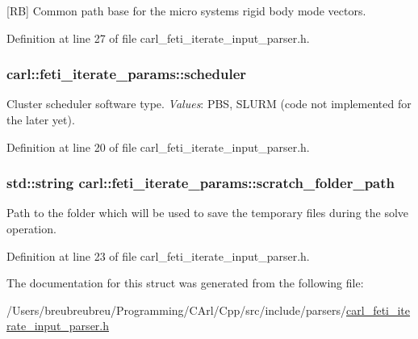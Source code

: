 \mbox{[}R\+B\mbox{]} Common path base for the micro system\textquotesingle{}s rigid body mode vectors. 



Definition at line 27 of file carl\+\_\+feti\+\_\+iterate\+\_\+input\+\_\+parser.\+h.

\hypertarget{structcarl_1_1feti__iterate__params_a5154ac3475a52b9973386fde31d82c83}{}
\subsubsection[{scheduler}]{ carl\+::feti\+\_\+iterate\+\_\+params\+::scheduler}\label{structcarl_1_1feti__iterate__params_a5154ac3475a52b9973386fde31d82c83}


Cluster scheduler software type. {\itshape Values}\+: P\+B\+S, S\+L\+U\+R\+M (code not implemented for the later yet). 



Definition at line 20 of file carl\+\_\+feti\+\_\+iterate\+\_\+input\+\_\+parser.\+h.

\hypertarget{structcarl_1_1feti__iterate__params_a6f87360ece51431590f3a03f15945e55}{}
\subsubsection[{scratch\+\_\+folder\+\_\+path}]{\setlength{\rightskip}{0pt plus 5cm}std\+::string carl\+::feti\+\_\+iterate\+\_\+params\+::scratch\+\_\+folder\+\_\+path}\label{structcarl_1_1feti__iterate__params_a6f87360ece51431590f3a03f15945e55}


Path to the folder which will be used to save the temporary files during the solve operation. 



Definition at line 23 of file carl\+\_\+feti\+\_\+iterate\+\_\+input\+\_\+parser.\+h.



The documentation for this struct was generated from the following file\+:\begin{DoxyCompactItemize}
\item 
/\+Users/breubreubreu/\+Programming/\+C\+Arl/\+Cpp/src/include/parsers/\hyperlink{carl__feti__iterate__input__parser_8h}{carl\+\_\+feti\+\_\+iterate\+\_\+input\+\_\+parser.\+h}\end{DoxyCompactItemize}
